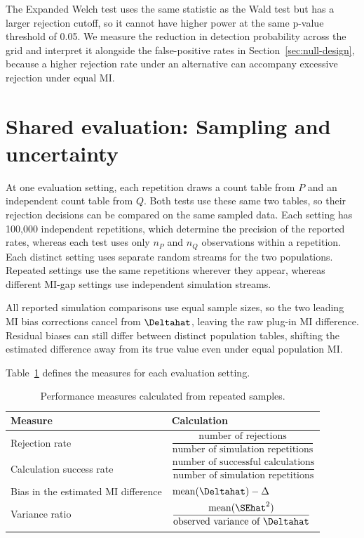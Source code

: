 The Expanded Welch test uses the same statistic as the Wald test but has a larger
rejection cutoff, so it cannot have higher power at the same p-value
threshold of 0.05.
We measure the reduction in detection probability across the grid and
interpret it alongside the false-positive rates in
Section~\ref{sec:null-design}, because a higher rejection rate under an
alternative can accompany excessive rejection under equal MI.

\section{Shared evaluation: Sampling and uncertainty}

At one evaluation setting, each repetition draws a count table from
\(P\) and an independent count table from \(Q\). Both tests use these
same two tables, so their rejection decisions
can be compared on the same sampled data. Each setting has 100,000
independent repetitions, which determine the precision of the reported
rates, whereas each test uses only \(n_P\) and \(n_Q\) observations within
a repetition. Each distinct setting uses separate random streams for the
two populations. Repeated settings use the same repetitions wherever they
appear, whereas different MI-gap settings use independent simulation streams.

All reported simulation comparisons use equal sample sizes, so the two
leading MI bias corrections cancel from \(\Deltahat\), leaving the raw
plug-in MI difference. Residual biases can still differ between distinct
population tables, shifting the estimated difference away from its true
value even under equal population MI.

Table~\ref{tab:design-performance-measures} defines the measures for each
evaluation setting.

\begin{table}[H]
\centering
\caption{Performance measures calculated from repeated samples.}
\label{tab:design-performance-measures}
\thesistableformat
\begin{tabularx}{\textwidth}{@{}>{\raggedright\arraybackslash}p{}>{\raggedright\arraybackslash}X@{}}
\toprule
\textbf{Measure} & \textbf{Calculation}\\
\midrule
\addlinespace[0.35em]
Rejection rate &
\(\dfrac{\text{number of rejections}}{\text{number of simulation repetitions}}\)\\
\addlinespace[0.85em]
Calculation success rate &
\(\dfrac{\text{number of successful calculations}}{\text{number of simulation repetitions}}\)\\
\addlinespace[0.85em]
Bias in the estimated MI difference &
\(\operatorname{mean}(\Deltahat)-\Delta\)\\
\addlinespace[0.85em]
Variance ratio &
\(\dfrac{\operatorname{mean}(\SEhat^2)}{\text{observed variance of }\Deltahat}\)\\
\addlinespace[0.35em]
\bottomrule
\end{tabularx}
\end{table}

